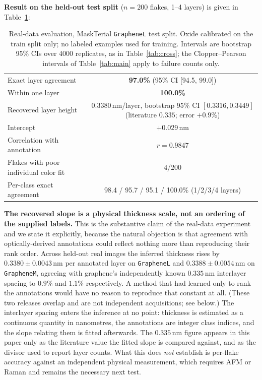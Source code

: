 \documentclass[10pt]{article}
\begin{document}
\textbf{Result on the held-out test split} ($n{=}200$ flakes, 1--4 layers) is given in Table~\ref{tab:real}:

\begin{table}[h]
\centering
\caption{Real-data evaluation, MaskTerial \texttt{GrapheneL} test split. Oxide calibrated on the train split only; no labeled examples used for training. Intervals are bootstrap 95\% CIs over 4000 replicates, as in Table~\ref{tab:cross}; the Clopper--Pearson intervals of Table~\ref{tab:main} apply to failure counts only.}
\label{tab:real}
\begin{tabular}{lc}
\toprule
Exact layer agreement & \textbf{97.0\%} (95\% CI [94.5, 99.0]) \\
Within one layer & \textbf{100.0\%} \\
Recovered layer height & $0.3380$\,nm/layer, bootstrap 95\% CI $[0.3316, 0.3449]$ (literature $0.335$; error $+0.9\%$) \\
Intercept & $+0.029$\,nm \\
Correlation with annotation & $r = 0.9847$ \\
Flakes with poor individual color fit & 4/200 \\
Per-class exact agreement & 98.4 / 95.7 / 95.1 / 100.0\% (1/2/3/4 layers) \\
\bottomrule
\end{tabular}
\end{table}

\textbf{The recovered slope is a physical thickness scale, not an ordering of the supplied labels.} This is the substantive claim of the real-data experiment and we state it explicitly, because the natural objection is that agreement with optically-derived annotations could reflect nothing more than reproducing their rank order. Across held-out real images the inferred thickness rises by $0.3380 \pm 0.0043$\,nm per annotated layer on \texttt{GrapheneL} and $0.3388 \pm 0.0054$\,nm on \texttt{GrapheneM}, agreeing with graphene's independently known $0.335$\,nm interlayer spacing to $0.9\%$ and $1.1\%$ respectively. A method that had learned only to rank the annotations would have no reason to reproduce that constant at all. (These two releases overlap and are not independent acquisitions; see below.) The interlayer spacing enters the inference at no point: thickness is estimated as a continuous quantity in nanometres, the annotations are integer class indices, and the slope relating them is fitted afterwards. The $0.335$\,nm figure appears in this paper only as the literature value the fitted slope is compared against, and as the divisor used to report layer counts. What this does \emph{not} establish is per-flake accuracy against an independent physical measurement, which requires AFM or Raman and remains the necessary next test.
\end{document}
